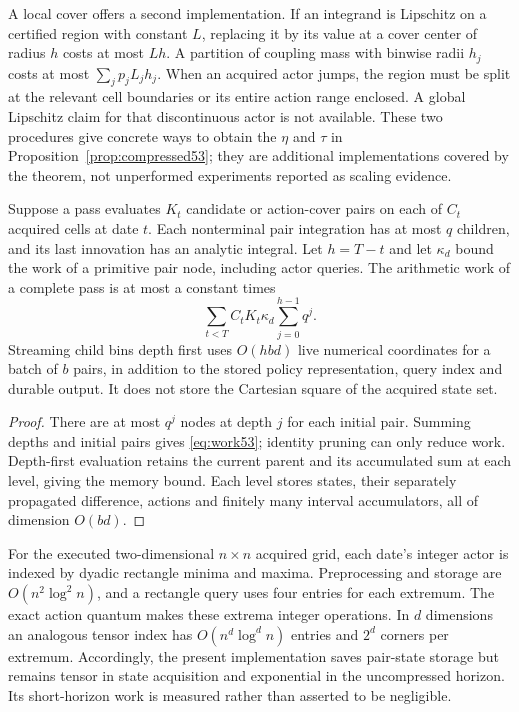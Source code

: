 A local cover offers a second implementation. If an integrand is Lipschitz on a certified region with constant $L$, replacing it by its value at a cover center of radius $h$ costs at most $Lh$. A partition of coupling mass with binwise radii $h_j$ costs at most $\sum_jp_jL_jh_j$. When an acquired actor jumps, the region must be split at the relevant cell boundaries or its entire action range enclosed. A global Lipschitz claim for that discontinuous actor is not available. These two procedures give concrete ways to obtain the $\eta$ and $\tau$ in Proposition~\ref{prop:compressed53}; they are additional implementations covered by the theorem, not unperformed experiments reported as scaling evidence.

\begin{proposition}\label{prop:work53}
Suppose a pass evaluates $K_t$ candidate or action-cover pairs on each of $C_t$ acquired cells at date $t$. Each nonterminal pair integration has at most $q$ children, and its last innovation has an analytic integral. Let $h=T-t$ and let $\kappa_d$ bound the work of a primitive pair node, including actor queries. The arithmetic work of a complete pass is at most a constant times
\begin{equation}\label{eq:work53}
 \sum_{t<T}C_tK_t\kappa_d\sum_{j=0}^{h-1}q^j.
\end{equation}
Streaming child bins depth first uses $O(hbd)$ live numerical coordinates for a batch of $b$ pairs, in addition to the stored policy representation, query index and durable output. It does not store the Cartesian square of the acquired state set.
\end{proposition}
\begin{proof}
There are at most $q^j$ nodes at depth $j$ for each initial pair. Summing depths and initial pairs gives \eqref{eq:work53}; identity pruning can only reduce work. Depth-first evaluation retains the current parent and its accumulated sum at each level, giving the memory bound. Each level stores states, their separately propagated difference, actions and finitely many interval accumulators, all of dimension $O(bd)$.
\end{proof}

For the executed two-dimensional $n\times n$ acquired grid, each date's integer actor is indexed by dyadic rectangle minima and maxima. Preprocessing and storage are $O(n^2\log^2n)$, and a rectangle query uses four entries for each extremum. The exact action quantum makes these extrema integer operations. In $d$ dimensions an analogous tensor index has $O(n^d\log^dn)$ entries and $2^d$ corners per extremum. Accordingly, the present implementation saves pair-state storage but remains tensor in state acquisition and exponential in the uncompressed horizon. Its short-horizon work is measured rather than asserted to be negligible.

